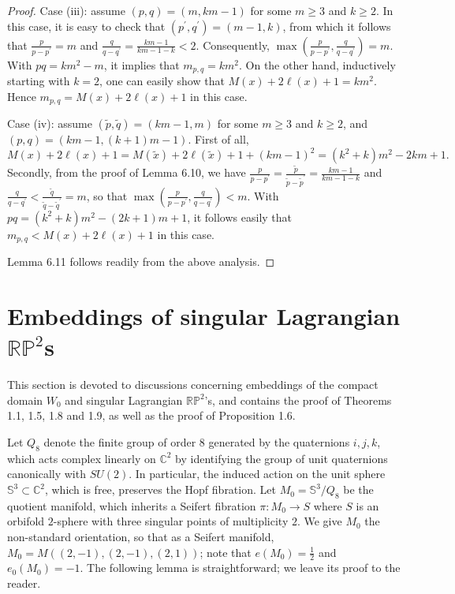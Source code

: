 \documentclass[11pt]{amsart}
\theoremstyle{plain}
\numberwithin{theorem}{section}
\theoremstyle{definition}
\newcommand{\C}{{\mathbb C}}
\newcommand{\R}{{\mathbb R}}
\renewcommand{\P}{{\mathbb P}}
\newcommand{\s}{{\mathbb S}}
\begin{document}
\begin{proof}
Case (iii): assume $(p,q)=(m, km-1)$ for some $m\geq 3$ and $k\geq 2$. In this case, it is easy to check that
$(p^\prime,q^\prime)=(m-1, k)$, from which it follows that $\frac{p}{p-p^\prime}=m$ and 
$\frac{q}{q-q^\prime}=\frac{km-1}{km-1-k}<2$. Consequently, $\max (\frac{p}{p-p^\prime},\frac{q}{q-q^\prime})=m$. With $pq=km^2-m$, it implies that $m_{p,q}=km^2$. On the other hand, inductively starting with $k=2$, one can easily show that $M(x)+2\ell(x)+1=km^2$. Hence $m_{p,q}=M(x)+2\ell(x)+1$ in this case. 

Case (iv): assume $(\tilde{p},\tilde{q})=(km-1,m)$ for some $m\geq 3$ and $k\geq 2$, and 
$(p,q)=(km-1,(k+1)m-1)$. First of all, 
$$
M(x)+2\ell(x)+1=M(\tilde{x})+2\ell(\tilde{x})+1+ (km-1)^2=(k^2+k)m^2-2km+1.
$$
Secondly, from the proof of Lemma 6.10, we have $\frac{p}{p-p^\prime}=\frac{\tilde{p}}{\tilde{p}-\tilde{p}^\prime}=\frac{km-1}{km-1-k}$ and $\frac{q}{q-q^\prime}<\frac{\tilde{q}}{\tilde{q}-\tilde{q}^\prime}=m$, 
so that $\max (\frac{p}{p-p^\prime},\frac{q}{q-q^\prime})<m$. With $pq=(k^2+k)m^2-(2k+1)m+1$, it follows easily
that $m_{p,q}< M(x)+2\ell(x)+1$ in this case. 

Lemma 6.11 follows readily from the above analysis. 

\end{proof}


\section{Embeddings of singular Lagrangian $\R\P^2$s}

This section is devoted to discussions concerning embeddings of the compact domain $W_0$ and singular Lagrangian $\R\P^2$'s, and contains the proof of Theorems 1.1, 1.5, 1.8 and 1.9, as well as the proof of 
Proposition 1.6.

Let $Q_8$ denote the finite group of order $8$ generated by the quaternions $i,j,k$, which acts complex linearly on $\C^2$ by identifying the group of unit quaternions canonically with $SU(2)$.
In particular, the induced action on the unit sphere $\s^3\subset \C^2$, which is free, preserves the Hopf fibration. Let $M_0=\s^3/Q_8$ be the quotient manifold, which inherits a Seifert fibration 
$\pi: M_0\rightarrow S$ where $S$ is an orbifold $2$-sphere with three singular points of multiplicity $2$. We give $M_0$ the non-standard orientation, so that as a Seifert manifold, $M_0=M((2,-1),(2,-1),(2,1))$; note that $e(M_0)=\frac{1}{2}$ and $e_0(M_0)=-1$. The following lemma is straightforward; we leave its proof to the reader. 
\end{document}

